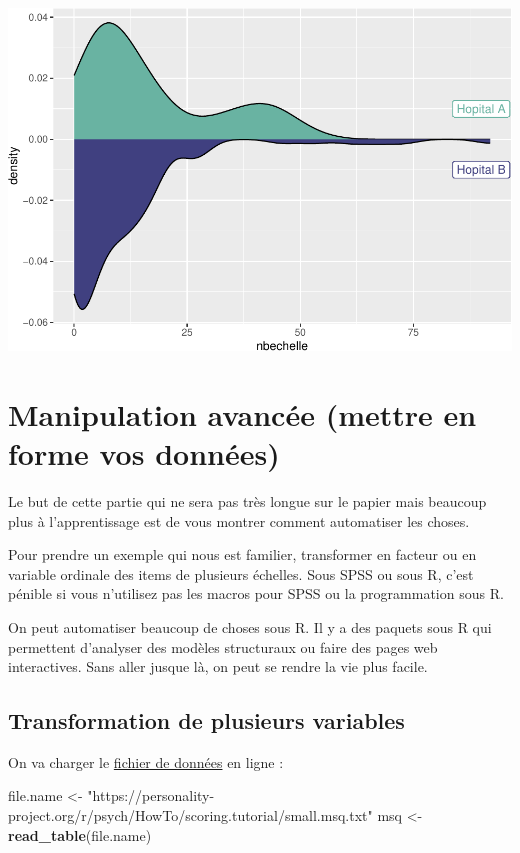 \documentclass[
]{book}
\newenvironment{Shaded}{\begin{snugshade}}{\end{snugshade}}
\newcommand{\FunctionTok}[1]{\textcolor[rgb]{0.13,0.29,0.53}{\textbf{#1}}}
\newcommand{\NormalTok}[1]{#1}
\newcommand{\OtherTok}[1]{\textcolor[rgb]{0.56,0.35,0.01}{#1}}
\newcommand{\StringTok}[1]{\textcolor[rgb]{0.31,0.60,0.02}{#1}}
\begin{document}
\includegraphics{_main_files/figure-latex/unnamed-chunk-80-1.pdf}

\chapter{Manipulation avancée (mettre en forme vos données)}\label{manipulation-avancuxe9e-mettre-en-forme-vos-donnuxe9es}

Le but de cette partie qui ne sera pas très longue sur le papier mais beaucoup
plus à l'apprentissage est de vous montrer comment automatiser les choses.

Pour prendre un exemple qui nous est familier, transformer en facteur ou en
variable ordinale des items de plusieurs échelles. Sous SPSS ou sous R, c'est
pénible si vous n'utilisez pas les macros pour SPSS ou la programmation
sous R.

On peut automatiser beaucoup de choses sous R. Il y a des paquets sous
R qui permettent d'analyser des modèles structuraux ou faire des pages web
interactives. Sans aller jusque là, on peut se rendre la vie plus facile.

\section{Transformation de plusieurs variables}\label{transformation-de-plusieurs-variables}

On va charger le \href{https://personality-project.org/r/psych/HowTo/scoring.tutorial/small.msq.txt}{fichier de données} en ligne :

\begin{Shaded}
\begin{Highlighting}[]
\NormalTok{file.name }\OtherTok{\textless{}{-}} \StringTok{"https://personality{-}project.org/r/psych/HowTo/scoring.tutorial/small.msq.txt"}
\NormalTok{msq }\OtherTok{\textless{}{-}} \FunctionTok{read\_table}\NormalTok{(file.name)}
\end{Highlighting}
\end{Shaded}
\end{document}
